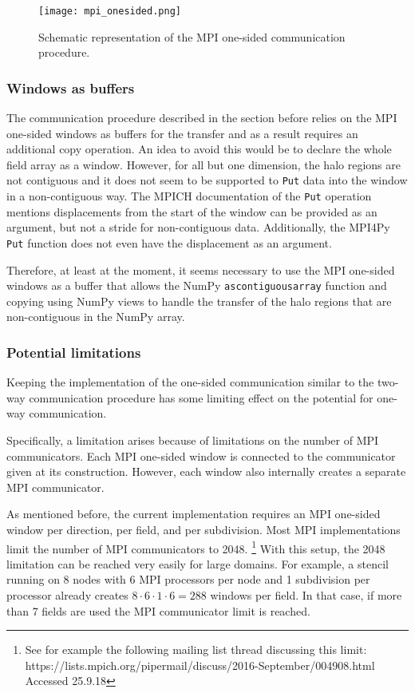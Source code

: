 \begin{figure}
\centering
\texttt{[image: mpi\_onesided.png]}
\caption{Schematic representation of the MPI one-sided communication procedure.}
\label{fig:mpi_onesided_communication_flow}
\end{figure}

\subsubsection{Windows as buffers}
The communication procedure described in the section before relies on the MPI one-sided windows as buffers for the transfer and as a result requires an additional copy operation.
An idea to avoid this would be to declare the whole field array as a window.
However, for all but one dimension, the halo regions are not contiguous and it does not seem to be supported to \texttt{Put} data into the window in a non-contiguous way.
The MPICH documentation of the \texttt{Put} operation mentions displacements from the start of the window can be provided as an argument, but not a stride for non-contiguous data.
Additionally, the MPI4Py \texttt{Put} function does not even have the displacement as an argument.

Therefore, at least at the moment, it seems necessary to use the MPI one-sided windows as a buffer that allows the NumPy \texttt{ascontiguousarray} function and copying using NumPy views to handle the transfer of the halo regions that are non-contiguous in the NumPy array.

\subsubsection{Potential limitations}
Keeping the implementation of the one-sided communication similar to the two-way communication procedure has some limiting effect on the potential for one-way communication.

Specifically, a limitation arises because of limitations on the number of MPI communicators.
Each MPI one-sided window is connected to the communicator given at its construction.
However, each window also internally creates a separate MPI communicator.

As mentioned before, the current implementation requires an MPI one-sided window per direction, per field, and per subdivision.
Most MPI implementations limit the number of MPI communicators to 2048. 
\footnote{See for example the following mailing list thread discussing this limit: https://lists.mpich.org/pipermail/discuss/2016-September/004908.html Accessed 25.9.18}
With this setup, the 2048 limitation can be reached very easily for large domains.
For example, a stencil running on 8 nodes with 6 MPI processors per node and 1 subdivision per processor already creates $8 \cdot 6 \cdot 1 \cdot 6 = 288$ windows per field.
In that case, if more than 7 fields are used the MPI communicator limit is reached.

